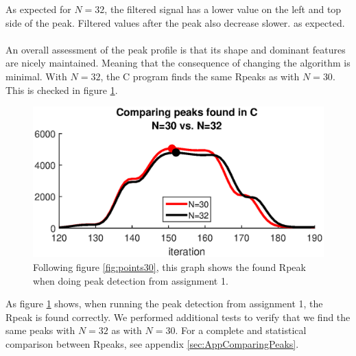 As expected for $N=32$, the filtered signal has a lower value on the left and top side of the peak. Filtered values after the peak also decrease slower. as expected.\\
\\
An overall assessment of the peak profile is that its shape and dominant features are nicely maintained. Meaning that the consequence of changing the algorithm is minimal. With $N=32$, the C program finds the same Rpeaks as with $N=30$. This is checked in figure \ref{fig:comparingPeaksC30C32}.

\begin{figure}[H]
\centering
\includegraphics[width=1.0\textwidth]{2Implementation/fig/comparingPeaksC30C32.eps}
\caption{Following figure \ref{fig:points30}, this graph shows the found Rpeak when doing peak detection from assignment 1.}
\label{fig:comparingPeaksC30C32}
\end{figure}

As figure \ref{fig:comparingPeaksC30C32} shows, when running the peak detection from assignment 1, the Rpeak is found correctly. We performed additional tests to verify that we find the same peaks with $N=32$ as with $N=30$. For a complete and statistical comparison between Rpeaks, see appendix \ref{sec:AppComparingPeaks}. 
